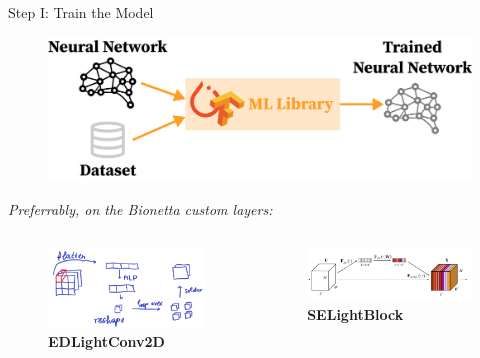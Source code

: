 \documentclass{zkdl-presentation-template}
\begin{document}
    \begin{frame}{Step I: Train the Model}
        \begin{figure}
            \centering
            \includegraphics[width=\textwidth]{images/ml.png}
        \end{figure}

        \pause

        \begin{center}
            \textit{Preferrably, on the Bionetta custom layers:}
        \end{center}

        \begin{columns}
            \begin{column}{0.5\textwidth}
                \begin{figure}
                    \centering
                    \includegraphics[width=\textwidth]{images/layer_1.png}
                    \caption{\textbf{EDLightConv2D}}
                \end{figure}
            \end{column}
        
            \begin{column}{0.5\textwidth}
                \begin{figure}
                    \centering
                    \includegraphics[width=\textwidth]{images/layer_2.png}
                    \caption{\textbf{SELightBlock}}
                \end{figure}
            \end{column}
        \end{columns}
    \end{frame}
\end{document}
